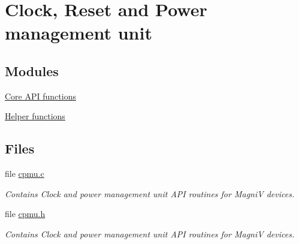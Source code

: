 \hypertarget{group___c_p_m_u}{}\section{Clock, Reset and Power management unit}
\label{group___c_p_m_u}
\subsection*{Modules}
\begin{DoxyCompactItemize}
\item 
\hyperlink{group___core}{Core A\+P\+I functions}
\item 
\hyperlink{group__helper}{Helper functions}
\end{DoxyCompactItemize}
\subsection*{Files}
\begin{DoxyCompactItemize}
\item 
file \hyperlink{cpmu_8c}{cpmu.\+c}
\begin{DoxyCompactList}\small\item\em Contains Clock and power management unit A\+P\+I routines for Magni\+V devices. \end{DoxyCompactList}\item 
file \hyperlink{cpmu_8h}{cpmu.\+h}
\begin{DoxyCompactList}\small\item\em Contains Clock and power management unit A\+P\+I routines for Magni\+V devices. \end{DoxyCompactList}\end{DoxyCompactItemize}
